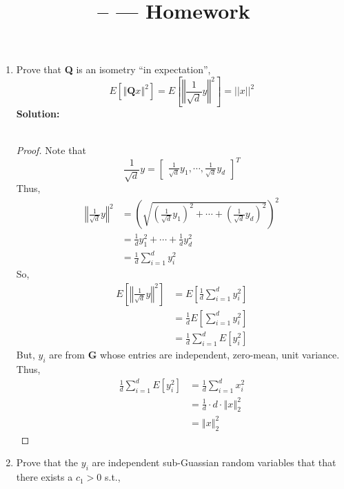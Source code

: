 \documentclass[11pt]{article}
\title{\CRS -- \Session --- Homework \Homework} %
\author{\Name}
\date{}
\begin{document}
\maketitle

\begin{enumerate}
	\item Prove that \textbf{Q} is an isometry ``in expectation'',
	\begin{equation}
		E \left[ \left\Vert \textbf{Q}x \right\Vert ^2 \right] = E \left[ \left\Vert \frac{1}{\sqrt{d}}y \right\Vert ^2 \right] = || x ||^2
	\end{equation}
	\textbf{Solution:} \\\\
	\begin{proof}
	Note that 
	\[
	\frac{1}{\sqrt{d}}y = \begin{bmatrix}
		\frac{1}{\sqrt{d}}y_1, \cdots, \frac{1}{\sqrt{d}}y_d
	\end{bmatrix}^{T}
	\]
	Thus, 
	\begin{align*}
		\left\Vert \frac{1}{\sqrt{d}}y \right\Vert ^2 &= \left( \sqrt{
			\left(\frac{1}{\sqrt{d}}y_1 \right)^2 + \cdots + \left(\frac{1}{\sqrt{d}}y_d \right)^2 }\right)^2 \\
			&= \frac{1}{d}y_1^2 + \cdots + \frac{1}{d}y_d^2 \\
			&= \frac{1}{d} \sum_{i = 1}^{d} y_i^2
	\end{align*}
	So, 
	\begin{align*}
		E \left[ \left\Vert \frac{1}{\sqrt{d}}y \right\Vert ^2 \right] &= E \left[ \frac{1}{d} \sum_{i = 1}^{d} y_i^2 \right] \\
		&= \frac{1}{d} E \left[ \sum_{i = 1}^{d} y_i^2 \right] \\
		&= \frac{1}{d} \sum_{i = 1}^{d} E \left[y_i^2 \right]
	\end{align*}
	But, $y_i$ are from \textbf{G} whose entries are independent, zero-mean, unit variance. Thus,
	\begin{align*}
		\frac{1}{d} \sum_{i = 1}^{d} E \left[y_i^2 \right] &= \frac{1}{d} \sum_{i = 1}^{d} x_i^2 \\
		&= \frac{1}{d} \cdot d \cdot \left\Vert x \right\Vert^2_2 \\
		&= \left\Vert x \right\Vert^2_2
	\end{align*}
	\end{proof}
	\item Prove that the $y_i$ are independent sub-Guassian random variables that that there exists a $c_1 > 0$ s.t.,
	\begin{equation*}

\end{equation*}
\end{enumerate}
\end{document}
